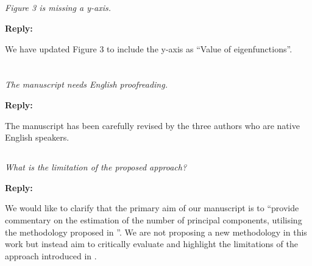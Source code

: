 \documentclass[12pt,a4paper]{article}
\newcommand{\comments}[1]{\subsection{}
\begin{mdframed}[style=comments] 
        \textit{#1}
\end{mdframed}}
\newcommand{\reply}[1]{
    \noindent\textbf{Reply:}

\begin{mdframed}[style=replies] 
    #1
\end{mdframed}
}
\begin{document}
\comments{Figure 3 is missing a y-axis.}

\reply{We have updated Figure 3 to include the y-axis as ``Value of eigenfunctions''.}


\section{}


\comments{The manuscript needs English proofreading.}
\reply{The manuscript has been carefully revised by the three authors who are native English speakers.}


\comments{What is the limitation of the proposed approach?}
\reply{We would like to clarify that the primary aim of our manuscript is to ``provide commentary on the estimation of the number of principal components, utilising the methodology proposed in \cite{happMultivariateFunctionalPrincipal2018}''. We are not proposing a new methodology in this work but instead aim to critically evaluate and highlight the limitations of the approach introduced in \cite{happMultivariateFunctionalPrincipal2018}.}


%
\printbibliography
% 
\end{document}
